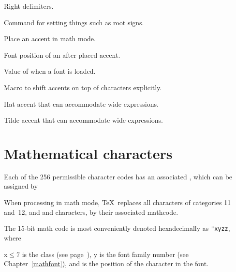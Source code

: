 \begin{inventory}
\item [\cs{bigr {\MainFont etc.}}]
      Right delimiters.

\item [\cs{radical}] 
      Command for setting things such as root signs.

\item [\cs{mathaccent}] 
      Place an accent in math mode.

\item [\cs{skewchar}] 
      Font position of an after-placed accent.

\item [\cs{defaultskewchar}] 
      Value of  when a font is loaded.

\item [\cs{skew}] 
      Macro to shift accents on top of characters explicitly.

\item [\cs{widehat}]
      Hat accent that can
      accommodate wide expressions.

\item [\cs{widetilde}]
      Tilde accent that can
      accommodate wide expressions.

\end{inventory}

\section{Mathematical characters}

Each of the 256 permissible character codes has
an associated , which can be assigned by
\begin{disp}\end{disp}
When processing in math mode, \TeX\ replaces all characters of
categories 11 and~12, and  and  characters,
by their associated mathcode.

The  15-bit math code is most conveniently denoted hexadecimally
as \verb-"xyzz-, where
\begin{disp}
\n x${}\leq7$ is the class (see page~\pageref{math:class}),\nl
\n y is the font family number \alt
(see Chapter~\ref{mathfont}), and \nl
{} is the position of the character in the font.\end{disp}

